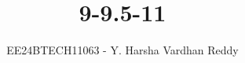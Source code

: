 \documentclass[journal]{IEEEtran}
\begin{document}

\vspace{3cm}

\title{9-9.5-11}
\author{EE24BTECH11063 - Y. Harsha Vardhan Reddy}
 \maketitle
{\let\newpage\relax\maketitle}

\renewcommand{\thefigure}{\theenumi}
\renewcommand{\thetable}{\theenumi}
\setlength{\intextsep}{10pt} %


\renewcommand{\thetable}{\theenumi}
\end{document}
